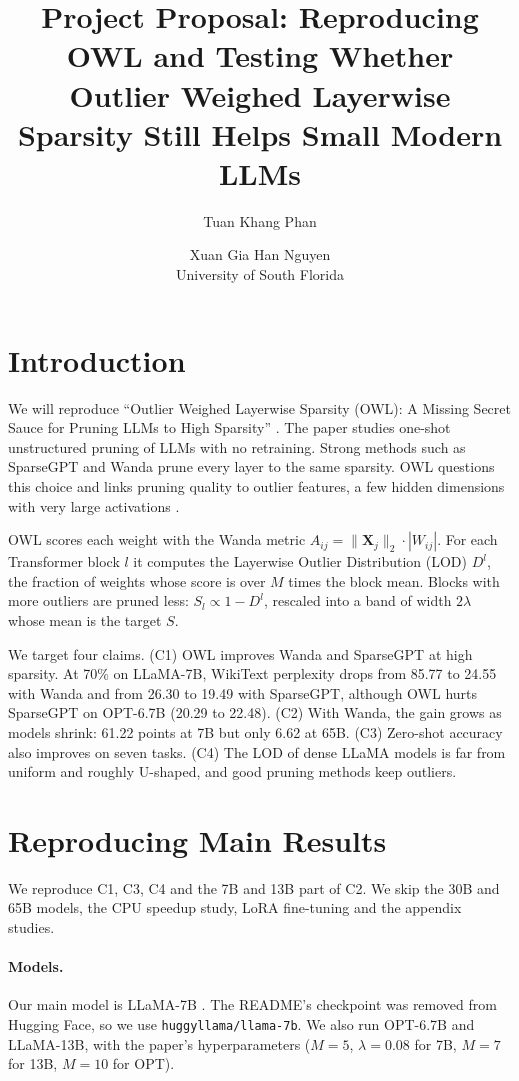 \documentclass[11pt]{article}
\title{Project Proposal: Reproducing OWL and Testing Whether\\
Outlier Weighed Layerwise Sparsity Still Helps Small Modern LLMs}
\author{Tuan Khang Phan \and Xuan Gia Han Nguyen \\
  University of South Florida}
\begin{document}
\maketitle

\section{Introduction}

We will reproduce ``Outlier Weighed Layerwise Sparsity (OWL): A Missing Secret Sauce for Pruning LLMs to High Sparsity'' \citep{yin2024owl}. The paper studies one-shot unstructured pruning of LLMs with no retraining. Strong methods such as SparseGPT \citep{frantar2023sparsegpt} and Wanda \citep{sun2024wanda} prune every layer to the same sparsity. OWL questions this choice and links pruning quality to outlier features, a few hidden dimensions with very large activations \citep{kovaleva2021bertbusters,dettmers2022llmint8}.

OWL scores each weight with the Wanda metric $A_{ij} = \lVert \mathbf{X}_j \rVert_2 \cdot |W_{ij}|$. For each Transformer block $l$ it computes the Layerwise Outlier Distribution (LOD) $D^l$, the fraction of weights whose score is over $M$ times the block mean. Blocks with more outliers are pruned less: $S_l \propto 1 - D^l$, rescaled into a band of width $2\lambda$ whose mean is the target $S$.

We target four claims. (C1) OWL improves Wanda and SparseGPT at high sparsity. At 70\% on LLaMA-7B, WikiText perplexity drops from 85.77 to 24.55 with Wanda and from 26.30 to 19.49 with SparseGPT, although OWL hurts SparseGPT on OPT-6.7B (20.29 to 22.48). (C2) With Wanda, the gain grows as models shrink: 61.22 points at 7B but only 6.62 at 65B. (C3) Zero-shot accuracy also improves on seven tasks. (C4) The LOD of dense LLaMA models is far from uniform and roughly U-shaped, and good pruning methods keep outliers.

\section{Reproducing Main Results}

We reproduce C1, C3, C4 and the 7B and 13B part of C2. We skip the 30B and 65B models, the CPU speedup study, LoRA fine-tuning and the appendix studies.

\paragraph{Models.} Our main model is LLaMA-7B \citep{touvron2023llama}. The README's checkpoint was removed from Hugging Face, so we use \texttt{huggyllama/llama-7b}. We also run OPT-6.7B \citep{zhang2022opt} and LLaMA-13B, with the paper's hyperparameters ($M{=}5$, $\lambda{=}0.08$ for 7B, $M{=}7$ for 13B, $M{=}10$ for OPT).
\end{document}

